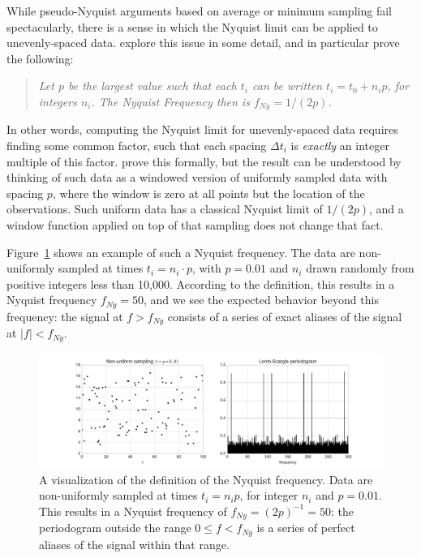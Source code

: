 \documentclass[preprint]{aastex}
\newcommand{\Fig}[1]{Figure~\ref{fig:#1}}
\newcommand{\figlabel}[1]{\label{fig:#1}}
\begin{document}
While pseudo-Nyquist arguments based on average or minimum sampling
fail spectacularly, there is a sense in which the Nyquist limit can
be applied to unevenly-spaced data. \citet{Eyer99} explore this issue
in some detail, and in particular prove the following:
\begin{quote}
{\it Let $p$ be the largest value such that each $t_i$ can be written
  $t_i = t_0 + n_i p$, for integers $n_i$. The Nyquist Frequency then
  is $f_{Ny} = 1 / (2p)$.}
\end{quote}
In other words, computing the Nyquist limit for unevenly-spaced data requires
finding some common factor, such that each spacing $\Delta t_i$ is {\it exactly}
an integer multiple of this factor.
\citet{Eyer99} prove this formally, but the result can be understood
by thinking of such data as a windowed version of uniformly sampled
data with spacing $p$, where the window is zero at all points but the
location of the observations.
Such uniform data has a classical Nyquist limit of $1/(2p)$, and a window
function applied on top of that sampling does not change that fact.

\Fig{nyquist-eyer99} shows an example of such a Nyquist frequency.
The data are non-uniformly sampled at times $t_i = n_i \cdot p$, with $p=0.01$
and $n_i$ drawn randomly from positive integers less than 10,000.
According to the \citet{Eyer99} definition,
this results in a Nyquist frequency $f_{Ny} = 50$, and we see the expected
behavior beyond this frequency: the signal at $f > f_{Ny}$ consists of a series
of exact aliases of the signal at $|f| < f_{Ny}$.

\begin{figure}[ht]
  \centering
  \includegraphics[width=\textwidth]{fig13_nyquist_eyer99}
  \caption{A visualization of the \citet{Eyer99} definition of the Nyquist
    frequency. Data are non-uniformly sampled at times $t_i = n_i p$, for
    integer $n_i$ and $p=0.01$.
    This results in a Nyquist frequency of $f_{Ny}= (2p)^{-1} = 50$:
    the periodogram outside the range $0 \le f < f_{Ny}$ is a series of
    perfect aliases of the signal within that range.
    \figlabel{nyquist-eyer99}}
\end{figure}
\end{document}
